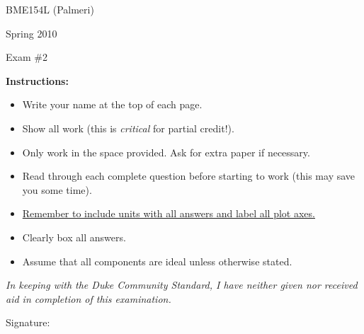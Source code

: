 

\vspace*{0.5in}

\centerline{\LARGE BME154L (Palmeri)}
\vspace*{0.25in}
\centerline{\LARGE Spring 2010}
\vspace*{0.25in}
\centerline{\LARGE Exam \#2}
\vspace*{0.25in}

{\bf Instructions:} 
\begin{itemize}
\item Write your name at the top of each page.
\item Show all work (this is {\it critical} for partial credit!).
\item Only work in the space provided.  Ask for extra paper if necessary.
\item Read through each complete question before starting to work (this may
save you some time).
\item \underline{Remember to include units with all answers and label all plot axes.}
\item Clearly box all answers.
\item Assume that all components are ideal unless otherwise stated.
\end{itemize}

\vspace*{2.0in}

\emph{In keeping with the Duke Community Standard, I have neither given nor received aid in completion of this examination.}

\vspace*{0.5in}

Signature:\underline{\hspace*{3.0in}}
